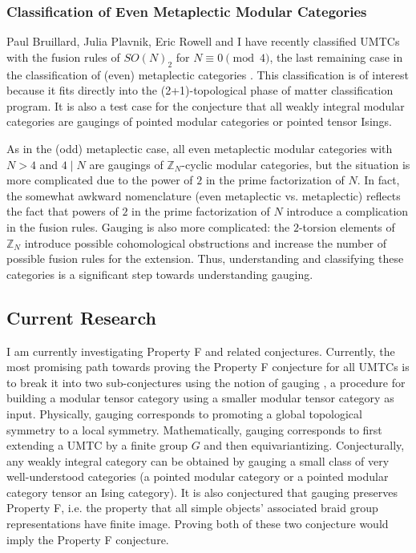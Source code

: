 \documentclass[12pt]{article}
\newcommand{\ZZ}{\mathbb{Z}}
\theoremstyle{definition}
\begin{document}
\subsubsection*{Classification of Even Metaplectic Modular Categories}

Paul Bruillard, Julia Plavnik, Eric Rowell and I have recently classified UMTCs with the fusion rules of $SO(N)_2$ for $N \equiv 0 \pmod{4}$, the last remaining case in the classification of (even) metaplectic categories \cite{bgpr}.  This classification is of interest because it fits directly into the (2+1)-topological phase of matter classification program.  It is also a test case for the conjecture that all weakly integral modular categories are gaugings of pointed modular categories or pointed tensor Isings.

As in the (odd) metaplectic case,  all even metaplectic modular categories with $N > 4$ and $4 \mid N$ are gaugings of $\ZZ_{N}$-cyclic modular categories, but the situation is more complicated due to the power of $2$ in the prime factorization of $N$. In fact, the somewhat awkward nomenclature (even metaplectic vs. metaplectic) reflects the fact that powers of $2$ in the prime factorization of $N$ introduce a complication in the fusion rules.   Gauging is also more complicated: the $2$-torsion elements of $\ZZ_N$ introduce possible cohomological obstructions and increase the number of possible fusion rules for the extension.  Thus, understanding and classifying these categories is a significant step towards understanding gauging.

\subsection*{Current Research}

I am currently investigating Property F and related conjectures.  Currently, the most promising path towards proving the Property F conjecture for all UMTCs is to break it into two sub-conjectures using the notion of gauging \cite{bbcw}, a procedure for building a modular tensor category using  a smaller modular tensor category as input.   Physically, gauging corresponds to promoting a global topological symmetry to a local symmetry.  Mathematically, gauging corresponds to first extending a UMTC by a finite group $G$ and then equivariantizing. Conjecturally, any weakly integral category can be obtained by gauging a small class of very well-understood categories (a pointed modular category or a pointed modular category tensor an Ising category).   It is also conjectured that gauging  preserves Property F, i.e. the property that all simple objects’ associated braid group representations have finite image.  Proving both of these two conjecture would imply the Property F conjecture.
\end{document}
